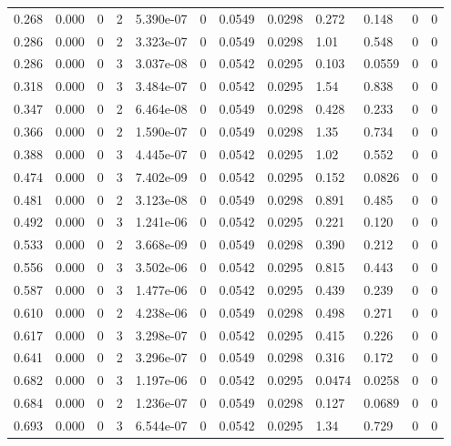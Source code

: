 \documentclass[preview]{standalone}
\begin{document}
{{\begin{tabular}{L{1.2cm}C{1.2cm} C{0.3cm}C{0.5cm} C{1.4cm}C{1.4cm} C{1.4cm}C{1.4cm} C{1.6cm}C{1.6cm} C{1.6cm}C{1.6cm}}
  0.268  &  0.000  & 0     &  2 &  5.390e-07  & 0  &  0.0549&   0.0298& 0.272 & 0.148   &  0 & 0  \\ 
  0.286  &  0.000  & 0     &  2 &  3.323e-07  & 0  &  0.0549&   0.0298& 1.01 & 0.548   &  0 & 0  \\ 
  0.286  &  0.000  & 0     &  3 &  3.037e-08  & 0  &  0.0542&   0.0295& 0.103 & 0.0559   &  0 & 0  \\ 
  0.318  &  0.000  & 0     &  3 &  3.484e-07  & 0  &  0.0542&   0.0295& 1.54 & 0.838   &  0 & 0  \\ 
  0.347  &  0.000  & 0     &  2 &  6.464e-08  & 0  &  0.0549&   0.0298& 0.428 & 0.233   &  0 & 0  \\ 
  0.366  &  0.000  & 0     &  2 &  1.590e-07  & 0  &  0.0549&   0.0298& 1.35 & 0.734   &  0 & 0  \\ 
  0.388  &  0.000  & 0     &  3 &  4.445e-07  & 0  &  0.0542&   0.0295& 1.02 & 0.552   &  0 & 0  \\ 
  0.474  &  0.000  & 0     &  3 &  7.402e-09  & 0  &  0.0542&   0.0295& 0.152 & 0.0826   &  0 & 0  \\ 
  0.481  &  0.000  & 0     &  2 &  3.123e-08  & 0  &  0.0549&   0.0298& 0.891 & 0.485   &  0 & 0  \\ 
  0.492  &  0.000  & 0     &  3 &  1.241e-06  & 0  &  0.0542&   0.0295& 0.221 & 0.120   &  0 & 0  \\ 
  0.533  &  0.000  & 0     &  2 &  3.668e-09  & 0  &  0.0549&   0.0298& 0.390 & 0.212   &  0 & 0  \\ 
  0.556  &  0.000  & 0     &  3 &  3.502e-06  & 0  &  0.0542&   0.0295& 0.815 & 0.443   &  0 & 0  \\ 
  0.587  &  0.000  & 0     &  3 &  1.477e-06  & 0  &  0.0542&   0.0295& 0.439 & 0.239   &  0 & 0  \\ 
  0.610  &  0.000  & 0     &  2 &  4.238e-06  & 0  &  0.0549&   0.0298& 0.498 & 0.271   &  0 & 0  \\ 
  0.617  &  0.000  & 0     &  3 &  3.298e-07  & 0  &  0.0542&   0.0295& 0.415 & 0.226   &  0 & 0  \\ 
  0.641  &  0.000  & 0     &  2 &  3.296e-07  & 0  &  0.0549&   0.0298& 0.316 & 0.172   &  0 & 0  \\ 
  0.682  &  0.000  & 0     &  3 &  1.197e-06  & 0  &  0.0542&   0.0295& 0.0474 & 0.0258   &  0 & 0  \\ 
  0.684  &  0.000  & 0     &  2 &  1.236e-07  & 0  &  0.0549&   0.0298& 0.127 & 0.0689   &  0 & 0  \\ 
  0.693  &  0.000  & 0     &  3 &  6.544e-07  & 0  &  0.0542&   0.0295& 1.34 & 0.729   &  0 & 0  \\ 

\end{tabular}}}
\end{document}
